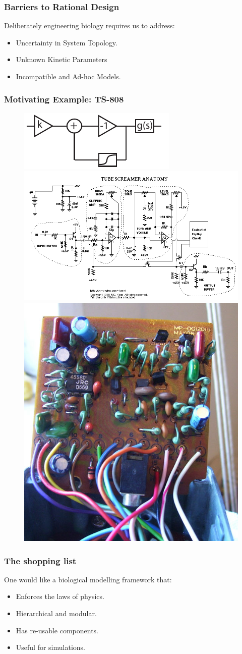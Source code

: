 \documentclass[12pt,reqno]{beamer}
\begin{document}
\begin{frame}
\frametitle{Barriers to Rational Design}
Deliberately engineering biology requires us to address:
\begin{itemize}
	\item Uncertainty in System Topology.
	\item Unknown Kinetic Parameters
	\item Incompatible and Ad-hoc Models.
\end{itemize}
\end{frame}
\begin{frame}
\frametitle{Motivating Example: TS-808}
\begin{figure}
	\includegraphics[width=0.35\linewidth]{distortion}\\
	\includegraphics[width=0.6\linewidth]{tsxtech}
	\includegraphics[width=0.3\linewidth]{vintage808board}
\end{figure}
\end{frame}
\begin{frame}
\frametitle{The shopping list}
One would like a biological modelling framework that:
\begin{itemize}
	\item Enforces the laws of physics.
	\item Hierarchical and modular.
    \item Has re-usable components.
	\item Useful for simulations.
\end{itemize}
\end{frame}
\end{document}
